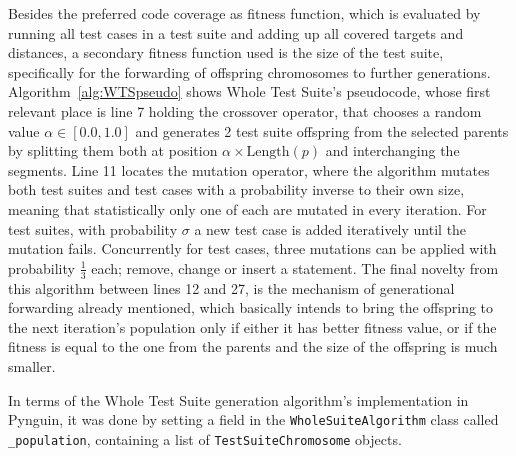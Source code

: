 \documentclass[%
  chapterprefix=false,%
  open=right,%
  twoside=true,%
  paper=a4,%
  logofile={Figures/logo.png},%
  thesistype=master,%
  UKenglish,%
]{se2thesis}
\newcommand{\classname}[1]{\texttt{#1}}
\newcommand{\field}[1]{\texttt{#1}}
\begin{document}
Besides the preferred code coverage as fitness function, which is evaluated by running all test cases in a test suite and adding up all covered targets and distances, a secondary fitness function used is the size of the test suite, specifically for the forwarding of offspring chromosomes to further generations.
Algorithm~\ref{alg:WTSpseudo} shows Whole Test Suite's pseudocode, whose first relevant place is line 7 holding the crossover operator, that chooses a random value \(\alpha \in [0.0, 1.0]\) and generates 2 test suite offspring from the selected parents by splitting them both at position \(\alpha \times \text{Length}(p)\) and interchanging the segments.
Line 11 locates the mutation operator, where the algorithm mutates both test suites and test cases with a probability inverse to their own size, meaning that statistically only one of each are mutated in every iteration.
For test suites, with probability \(\sigma\) a new test case is added iteratively until the mutation fails.
Concurrently for test cases, three mutations can be applied with probability \(\frac{1}{3}\) each; remove, change or insert a statement.
The final novelty from this algorithm between lines 12 and 27, is the mechanism of generational forwarding already mentioned, which basically intends to bring the offspring to the next iteration's population only if either it has better fitness value, or if the fitness is equal to the one from the parents and the size of the offspring is much smaller.

In terms of the Whole Test Suite generation algorithm's implementation in Pynguin, it was done by setting a field in the \classname{WholeSuiteAlgorithm} class called \field{\_population}, containing a list of \classname{TestSuiteChromosome} objects.

\newpage
\end{document}
